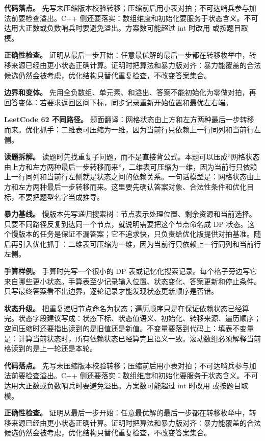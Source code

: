 \textbf{代码落点。} 先写未压缩版本校验转移；压缩前后用小表对拍；不可达哨兵参与加法前要检查溢出。C++ 侧还要落实：数组维度和初始化要服务于状态含义。不可达用大正数或负数哨兵时要避免溢出。方案数可能超过 int 时改用  或按题目取模。

\textbf{正确性检查。} 证明从最后一步开始：任意最优解的最后一步都在转移枚举中，转移来源已经由更小状态正确计算。证明时把算法和暴力版对齐：暴力能覆盖的合法候选仍然会被考虑，优化结构只替代重复检查，不改变答案集合。

\textbf{边界和变体。} 先用全负数组、单元素、和溢出、答案不能初始化为零做对拍，再回答变体：若要求返回区间下标，同步记录重新开始位置和最优左右端。

\noindent\textbf{LeetCode 62 不同路径。} 题面翻译：网格状态由上方和左方两种最后一步转移而来。优化抓手：二维表可压缩为一维，因为当前行只依赖上一行同列和当前行左侧。

\textbf{读题拆解。} 读题时先找重复子问题，而不是直接背公式。本题可以压成“网格状态由上方和左方两种最后一步转移而来”，二维表可压缩为一维，因为当前行只依赖上一行同列和当前行左侧就是状态之间的依赖关系。一句话模型是：网格状态由上方和左方两种最后一步转移而来。这里要先确认答案对象、合法性条件和优化目标，不要把题型名字当成推导。

\textbf{暴力基线。} 慢版本先写递归搜索树：节点表示处理位置、剩余资源和当前选择。只要不同路径反复到达同一个节点，就说明需要把这个节点命名成 DP 状态。这个慢版本的任务是保证不漏答案；它不追求快，只负责给优化版提供对拍基准。随后再引入优化抓手：二维表可压缩为一维，因为当前行只依赖上一行同列和当前行左侧。

\textbf{手算样例。} 手算时先写一个很小的 DP 表或记忆化搜索记录。每个格子旁边写它来自哪些更小状态。手算表至少记录输入位置、状态变化、答案更新和停止条件。只写最终答案看不出边界，逐轮记录才能发现状态更新顺序是否错。

\textbf{状态升级。} 把重复递归节点命名为状态；遍历顺序只是在保证依赖状态已经算完。状态字段建议写成：状态下标、状态值语义、初始化、转移来源、遍历顺序；空间压缩时还要指出读到的是旧值还是新值。不变量要落到代码上：填表不变量是：计算当前状态时，所有依赖状态已经算完且语义一致。滚动数组必须解释当前格读到的是上一轮还是本轮。

\textbf{代码落点。} 先写未压缩版本校验转移；压缩前后用小表对拍；不可达哨兵参与加法前要检查溢出。C++ 侧还要落实：数组维度和初始化要服务于状态含义。不可达用大正数或负数哨兵时要避免溢出。方案数可能超过 int 时改用  或按题目取模。

\textbf{正确性检查。} 证明从最后一步开始：任意最优解的最后一步都在转移枚举中，转移来源已经由更小状态正确计算。证明时把算法和暴力版对齐：暴力能覆盖的合法候选仍然会被考虑，优化结构只替代重复检查，不改变答案集合。

